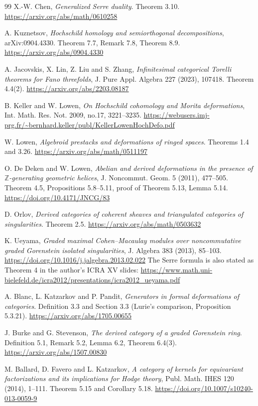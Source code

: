 \documentclass[a4paper,11pt]{ltjsarticle}
\theoremstyle{definition}
\begin{document}
\begin{thebibliography}{99}
X.-W. Chen,
\emph{Generalized Serre duality}.
Theorem 3.10.
\url{https://arxiv.org/abs/math/0610258}

A. Kuznetsov,
\emph{Hochschild homology and semiorthogonal decompositions},
arXiv:0904.4330.
Theorem 7.7, Remark 7.8, Theorem 8.9.
\url{https://arxiv.org/abs/0904.4330}

A. Jacovskis, X. Lin, Z. Liu and S. Zhang,
\emph{Infinitesimal categorical Torelli theorems for Fano threefolds},
J. Pure Appl. Algebra 227 (2023), 107418.
Theorem 4.4(2).
\url{https://arxiv.org/abs/2203.08187}

B. Keller and W. Lowen,
\emph{On Hochschild cohomology and Morita deformations},
Int. Math. Res. Not. 2009, no.17, 3221--3235.
\url{https://webusers.imj-prg.fr/~bernhard.keller/publ/KellerLowenHochDefo.pdf}

W. Lowen,
\emph{Algebroid prestacks and deformations of ringed spaces}.
Theorems 1.4 and 3.26.
\url{https://arxiv.org/abs/math/0511197}

O. De Deken and W. Lowen,
\emph{Abelian and derived deformations in the presence of
$\mathbb Z$-generating geometric helices},
J. Noncommut. Geom. 5 (2011), 477--505.
Theorem 4.5, Propositions 5.8--5.11, proof of Theorem 5.13, Lemma 5.14.
\url{https://doi.org/10.4171/JNCG/83}

D. Orlov,
\emph{Derived categories of coherent sheaves and triangulated categories of singularities}.
Theorem 2.5.
\url{https://arxiv.org/abs/math/0503632}

K. Ueyama,
\emph{Graded maximal Cohen--Macaulay modules over noncommutative graded
Gorenstein isolated singularities},
J. Algebra 383 (2013), 85--103.
\url{https://doi.org/10.1016/j.jalgebra.2013.02.022}
The Serre formula is also stated as Theorem 4 in the author's ICRA XV slides:
\url{https://www.math.uni-bielefeld.de/icra2012/presentations/icra2012_ueyama.pdf}

A. Blanc, L. Katzarkov and P. Pandit,
\emph{Generators in formal deformations of categories}.
Definition 3.3 and Section 3.3 (Lurie's comparison, Proposition 5.3.21).
\url{https://arxiv.org/abs/1705.00655}

J. Burke and G. Stevenson,
\emph{The derived category of a graded Gorenstein ring}.
Definition 5.1, Remark 5.2, Lemma 6.2, Theorem 6.4(3).
\url{https://arxiv.org/abs/1507.00830}

M. Ballard, D. Favero and L. Katzarkov,
\emph{A category of kernels for equivariant factorizations and its implications for Hodge theory},
Publ. Math. IHES 120 (2014), 1--111.
Theorem 5.15 and Corollary 5.18.
\url{https://doi.org/10.1007/s10240-013-0059-9}


\end{thebibliography}
\end{document}
